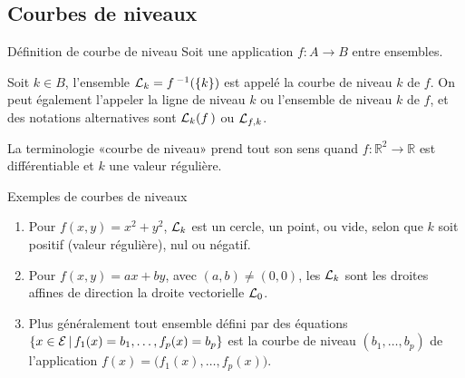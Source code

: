 \documentclass[11pt]{m53beamer}
\begin{document}
\subsection{Courbes de niveaux}

\begin{frame}{Définition de courbe de niveau}
  Soit une application $f:A \to B$ entre ensembles.
  \begin{definition}
    Soit $k \in B$, l'ensemble $\mathcal{L}_{k}=f\,^{-1}(\{k\})$ est appelé \alert{la courbe de niveau $k$} de $f$.\pause{} On peut également l'appeler \alert{la ligne de niveau $k$} ou \alert{l'ensemble de niveau $k$} de $f$, et des notations alternatives sont $\mathcal{L}_{k}(f\,)$ ou $\mathcal{L}_{f,k}$.
  \end{definition}\pause
  La terminologie «courbe de niveau» prend tout son sens quand $f:\mathbb{R}^{2} \to \mathbb{R}$ est différentiable et $k$ une valeur régulière.
\end{frame}
\begin{frame}{Exemples de courbes de niveaux}
  \begin{enumerate}[<+(1)->]
    \item Pour $f(x,y)=x^{2}+y^{2}$, $\mathcal{L}_{k}$ est un cercle, un point, ou vide, selon que $k$ soit positif (valeur régulière), nul ou négatif.
    \item Pour $f(x,y)=ax+by$, avec $(a,b)\neq(0,0)$, les $\mathcal{L}_{k}$ sont les droites affines de direction la droite vectorielle $\mathcal{L}_{0}$.
    \item Plus généralement tout ensemble défini par des équations $\{ x \in \mathcal{E} \,|\, f_{1}(x)=b_{1},\ldots,f_{p}(x)=b_{p}\}$ est la courbe de niveau $(b_{1},\ldots,b_{p})$ de l'application $f(x)=\big(f_{1}(x),\ldots,f_{p}(x)\big)$.
  \end{enumerate}
\end{frame}
\end{document}
